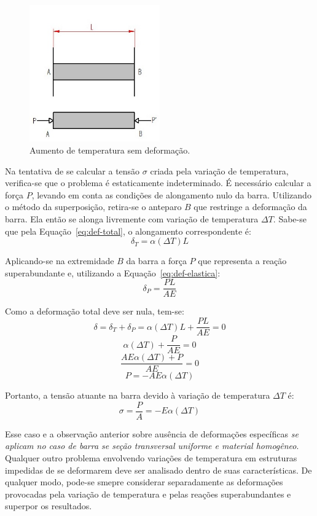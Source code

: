 \begin{figure}[H]
	\begin{center}
	\caption{Aumento de temperatura sem deformação.}
    	\includegraphics[width=0.5\textwidth]{Resistencia-dos-materiais/Imagens/Variacao-de-temperatura-sem-deformacao.jpg}
	\end{center}
\end{figure}

Na tentativa de se calcular a tensão $\sigma$ criada pela variação de temperatura, verifica-se que o problema é estaticamente indeterminado. É necessário calcular a força $P$, levando em conta as condições de alongamento nulo da barra. Utilizando o método da superposição, retira-se o anteparo $B$ que restringe a deformação da barra. Ela então se alonga livremente com variação de temperatura $\Delta T$. Sabe-se que pela Equação~\eqref{eq:def-total}, o alongamento correspondente é:
$$\delta_T=\alpha(\Delta T)L$$

Aplicando-se na extremidade $B$ da barra a força $P$ que representa a reação superabundante e, utilizando a Equação~\eqref{eq:def-elastica}:
$$\delta_P=\frac{PL}{AE}$$

Como a deformação total deve ser nula, tem-se:
$$\delta=\delta_T+\delta_P=\alpha(\Delta T)L+\frac{PL}{AE}=0$$
$$\alpha(\Delta T)+\frac{P}{AE}=0$$
$$\frac{AE\alpha(\Delta T)+P}{AE}=0$$
$$P=-AE\alpha(\Delta T)$$

Portanto, a tensão atuante na barra devido à variação de temperatura $\Delta T$ é:
$$\sigma=\frac{P}{A}=-E\alpha(\Delta T)$$

Esse caso e a observação anterior sobre ausência de deformações específicas \textit{se aplicam no caso de barra se seção transversal uniforme e material homogêneo}. Qualquer outro problema envolvendo variações de temperatura em estruturas impedidas de se deformarem deve ser analisado dentro de suas características. De qualquer modo, pode-se smepre considerar separadamente as deformações provocadas pela variação de temperatura e pelas reações superabundantes e superpor os resultados.